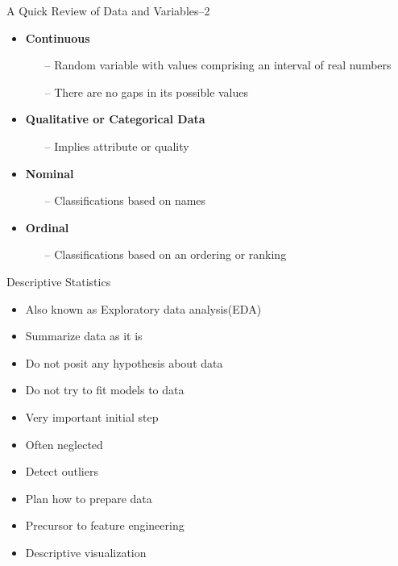 \begin{frame}[t]{A Quick Review of Data and Variables--2}
	\begin{itemize}
		\item \textbf{Continuous}
		\begin{itemize}
			\item[--] Random variable with values comprising an interval of
			real numbers
			\item [--]  There are no gaps in its possible values
		\end{itemize}
	\end{itemize}
	
	
	\begin{itemize}
		\item\textbf{Qualitative or Categorical Data}
		\begin{itemize}
			\item[--] Implies attribute or quality
		\end{itemize}
	\end{itemize}

	\begin{itemize}
		\item \textbf{Nominal}
		\begin{itemize}
			\item[--] Classifications based on names
		\end{itemize}
	\end{itemize}
		
	\begin{itemize}
		\item \textbf{Ordinal}
		\begin{itemize}
			\item[--] Classifications based on an ordering or ranking
		\end{itemize}
	\end{itemize}
\end{frame}
\begin{frame}[t]{Descriptive Statistics}
	\begin{itemize}
		\item Also known as Exploratory data analysis(EDA) 
		\item Summarize data as it is 
		\item Do not posit any hypothesis about data
		\item Do not try to fit models to data
		\item Very important initial step
		\item Often neglected 
		\item Detect outliers
		\item Plan how to prepare data
		\item Precursor to feature engineering
		\item Descriptive visualization
	\end{itemize}
\end{frame}

